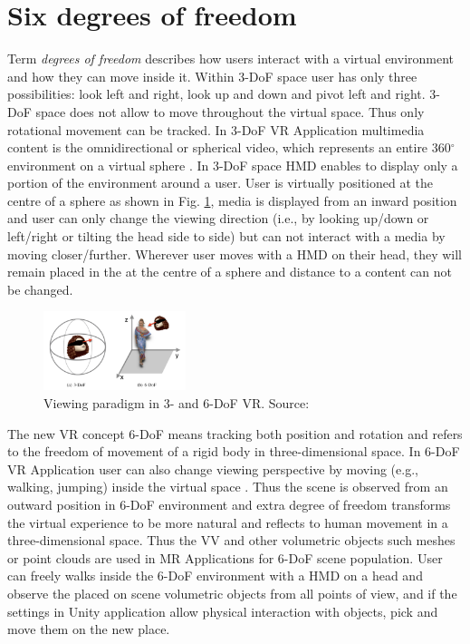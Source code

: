 \section{Six degrees of freedom}
\label{sec:theorie:6dof} 
Term \textit{degrees of freedom} describes how users interact with a virtual environment and how they can move inside it. Within 3-DoF space user has only three possibilities: look left and right, look up and down and pivot left and right. 3-DoF space does not allow to move throughout the virtual space. Thus only rotational movement can be tracked. In 3-DoF VR Application multimedia content is the omnidirectional or spherical video, which represents an entire 360$^{\circ}$ environment on a virtual sphere \cite{6-dof_metrics}. In 3-DoF space HMD enables to display only a portion of the environment around a user. User is virtually positioned at the centre of a sphere as shown in Fig. \ref{fig:3and6dof}, media is displayed from an inward position and user can only change the viewing direction (i.e., by looking up/down or left/right or tilting the head side to side) \cite{6-dof_metrics} but can not interact with a media by moving closer/further. Wherever user moves with a HMD on their head, they will remain placed in the  at the centre of a sphere and distance to a content can not be changed.
\begin{figure}
	\centering
	\includegraphics[width=0.37\textwidth]{gfx/3-6dof.png}
	\caption{\label{fig:3and6dof}Viewing paradigm in 3- and 6-DoF VR. Source: \cite{6-dof_metrics}}
\end{figure}

The new VR concept 6-DoF means tracking both position and rotation and refers to the freedom of movement of a rigid body in three-dimensional space. In 6-DoF VR Application user can also change viewing perspective by moving (e.g., walking, jumping) inside the virtual space \cite{6-dof_metrics}. Thus the scene is observed from an outward position in 6-DoF environment and extra degree of freedom transforms the virtual experience to be more natural and reflects to human movement in a three-dimensional space. Thus the VV and other volumetric objects such meshes or point clouds are used in MR Applications for 6-DoF scene population. User can freely walks inside the 6-DoF environment with a HMD on a head and observe the placed on scene volumetric objects from all points of view, and if the settings in Unity application allow physical interaction with objects, pick and move them on the new place. 

